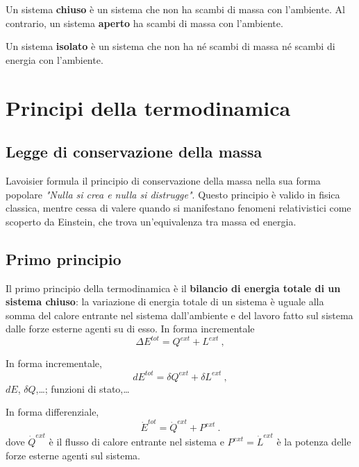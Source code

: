 \begin{definition} Un sistema \textbf{chiuso} è un sistema che non ha scambi di massa con l'ambiente. Al contrario, un sistema \textbf{aperto} ha scambi di massa con l'ambiente.
\end{definition}

\begin{definition} Un sistema \textbf{isolato} è un sistema che non ha né scambi di massa né scambi di energia con l'ambiente.
\end{definition}

\section{Principi della termodinamica}
\subsection{Legge di conservazione della massa}
Lavoisier formula il principio di conservazione della massa nella sua forma popolare \textit{"Nulla si crea e nulla si distrugge"}. Questo principio è valido in fisica classica, mentre cessa di valere quando si manifestano fenomeni relativistici come scoperto da Einstein, che trova un'equivalenza tra massa ed energia.

\subsection{Primo principio}
Il primo principio della termodinamica è il \textbf{bilancio di energia totale di un sistema chiuso}: la variazione di energia totale di un sistema è uguale alla somma del calore entrante nel sistema dall'ambiente e del lavoro fatto sul sistema dalle forze esterne agenti su di esso. In forma incrementale
\begin{equation}
  \Delta E^{tot} = Q^{ext} + L^{ext} \ ,
\end{equation}

\noindent
In forma incrementale,
\begin{equation}
  d E^{tot} = \delta Q^{ext} + \delta L^{ext} \ ,
\end{equation}
{\color{red} $dE$, $\delta Q$,\dots; funzioni di stato,\dots}

\noindent
In forma differenziale,
\begin{equation}
  \dot{E}^{tot} = \dot{Q}^{ext} + P^{ext} \ .
\end{equation}
dove $\dot{Q}^{ext}$ è il flusso di calore entrante nel sistema e $P^{ext} = \dot{L}^{ext}$ è la potenza delle forze esterne agenti sul sistema.
%
